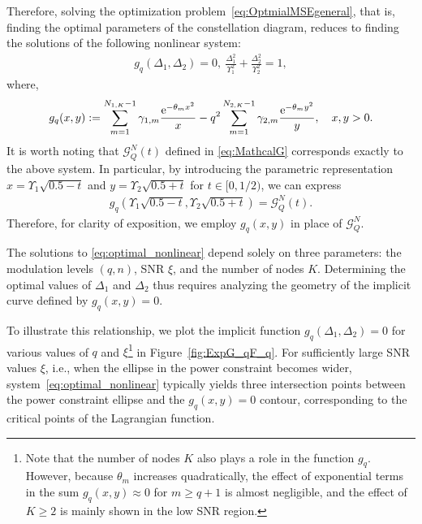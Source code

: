 \documentclass[journal,12pt,onecolumn,draftclsnofoot]{IEEEtran}
\theoremstyle{definition}
\begin{document}
Therefore, solving the optimization problem~\eqref{eq:OptmialMSEgeneral}, that is, finding the optimal parameters of the constellation diagram, reduces to finding the solutions of the following nonlinear system:
\begin{align}
    \label{eq:optimal_nonlinear}
     g_q(\Delta_1,\Delta_2)= 0, ~ \frac{\Delta_1^2}{\Upsilon_1^2} + \frac{\Delta_2^2}{\Upsilon_2^2} = 1,
\end{align}
where, 
\begin{align}
     \label{eq:gq(x,y)}
    g_q(x,y) :=  \sum_{m=1}^{N_{1,K}-1} \gamma_{1,m} \frac{{\rm e}^{-\theta_{m}  x^2}}{x} - q^2\sum_{m=1}^{N_{2,K}-1}\gamma_{2,m}\frac{{\rm e}^{-\theta_{m}  y^2}}{y},\quad x,y>0.
\end{align}
It is worth noting that $\mathcal{G}_Q^{N}(t)$ defined in \eqref{eq:MathcalG} corresponds exactly to the above system. In particular, by introducing the parametric representation  $x = \Upsilon_1\sqrt{0.5-t}$ and $y = \Upsilon_2\sqrt{0.5+t}$ for $t\in [0,1/2)$, we can express
\begin{align}
   \label{eq:bivariaterep}
    g_q( \Upsilon_1\sqrt{0.5-t}, \Upsilon_2\sqrt{0.5+t} ) = \mathcal{G}_Q^{N}(t). 
\end{align}
Therefore, for clarity of exposition, we employ $g_q(x,y)$ in place of $\mathcal{G}_Q^{N}$.

The solutions to \eqref{eq:optimal_nonlinear} depend solely on three parameters: the modulation levels $(q,n)$, SNR $\xi$, and the number of nodes $K$. Determining the optimal values of $\Delta_1$ and $\Delta_2$ thus requires analyzing the geometry of the implicit curve defined by $g_q(x,y)=0$.

To illustrate this relationship, we plot the implicit function $ g_q(\Delta_1,\Delta_2) = 0$ for various values of $q$ and $\xi$\footnote{Note that the number of nodes $K$ also plays a role in the function $g_q$. However, because $\theta_m$ increases quadratically, the effect of exponential terms in the sum $g_q(x,y)\approx 0$ for $m\geq q+1$ is almost negligible, and the effect of $K\geq2$ is mainly shown in the low SNR region.} in Figure~\ref{fig:ExpG_qF_q}. For sufficiently large SNR values $\xi$,  i.e.,  when the ellipse in the power constraint becomes wider, system~\eqref{eq:optimal_nonlinear} typically yields three intersection points between the power constraint ellipse and the $g_q(x,y) = 0 $ contour, corresponding to the critical points of the Lagrangian function. 
\end{document}
